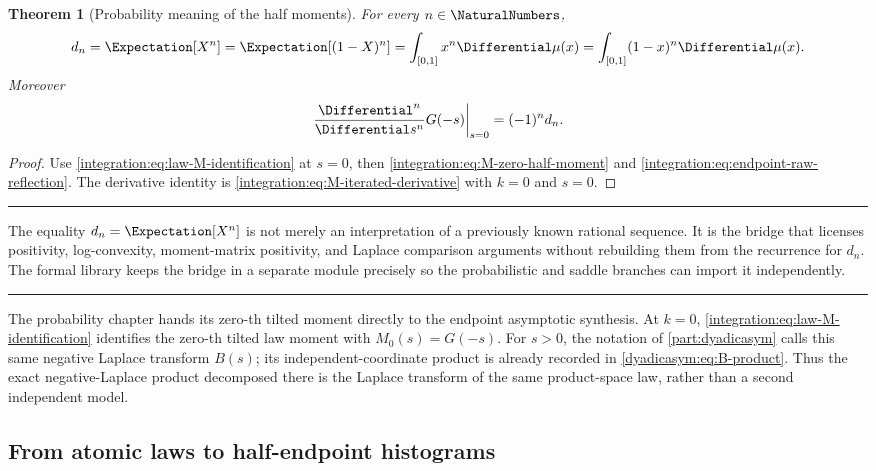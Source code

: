 \documentclass[11pt,oneside]{article}
\newtheorem{theorem}{Theorem}[section]
\theoremstyle{definition}
\theoremstyle{remark}
\newenvironment{boxedremark}{%
  \par\smallskip\noindent\begin{center}\begin{minipage}{0.94\textwidth}%
  \color{black}\hrule\vspace{0.6em}\small
}{%
  \vspace{0.6em}\hrule\end{minipage}\end{center}\smallskip
}
\begin{document}
\begin{theorem}[Probability meaning of the half moments]
\label{integration:thm:half-moments-probability}
For every $n\in\NaturalNumbers$,
\begin{equation}
 d_n=\Expectation[X^n]=\Expectation[(1-X)^n]
     =\int_{[0,1]}x^n\Differential\mu(x)
     =\int_{[0,1]}(1-x)^n\Differential\mu(x).
 \label{integration:eq:half-moment-probability}
\end{equation}
Moreover
\begin{equation}
 \left.\frac{\Differential^n}{\Differential s^n}G(-s)\right|_{s=0}=(-1)^nd_n.
 \label{integration:eq:generating-jet-half-moments}
\end{equation}
\end{theorem}

\begin{proof}
Use \eqref{integration:eq:law-M-identification} at $s=0$, then
\eqref{integration:eq:M-zero-half-moment} and \eqref{integration:eq:endpoint-raw-reflection}.  The derivative identity
is \eqref{integration:eq:M-iterated-derivative} with $k=0$ and $s=0$.
\end{proof}

\begin{boxedremark}
The equality $d_n=\Expectation[X^n]$ is not merely an interpretation of a previously known rational
sequence.  It is the bridge that licenses positivity, log-convexity, moment-matrix
positivity, and Laplace comparison arguments without rebuilding them from the recurrence for
$d_n$.  The formal library keeps the bridge in a separate module precisely so the
probabilistic and saddle branches can import it independently.
\end{boxedremark}

The probability chapter hands its zero-th tilted moment directly to the endpoint
asymptotic synthesis.  At \(k=0\),
\eqref{integration:eq:law-M-identification} identifies the zero-th tilted law moment with
\(M_0(s)=G(-s)\).  For \(s>0\), the notation of \cref{part:dyadicasym} calls this same
negative Laplace transform \(B(s)\); its independent-coordinate product is already recorded
in \eqref{dyadicasym:eq:B-product}.  Thus the exact negative-Laplace product decomposed there
is the Laplace transform of the same product-space law, rather than a second independent
model.

\subsection{From atomic laws to half-endpoint histograms}
\label{integration:sec:step-measure-bridge}
\end{document}
